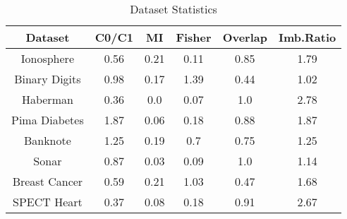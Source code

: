\begin{table}[htbp]
\caption{Dataset Statistics}
\begin{center}
\begin{tabular}{|c|c|c|c|c|c|}
\hline
\textbf{Dataset} & \textbf{C0/C1} & \textbf{MI} & \textbf{Fisher} & \textbf{Overlap} & \textbf{Imb.Ratio} \\ \hline
Ionosphere & 0.56 & 0.21 & 0.11 & 0.85 & 1.79 \\ \hline
Binary Digits & 0.98 & 0.17 & 1.39 & 0.44 & 1.02 \\ \hline
Haberman & 0.36 & 0.0 & 0.07 & 1.0 & 2.78 \\ \hline
Pima Diabetes & 1.87 & 0.06 & 0.18 & 0.88 & 1.87 \\ \hline
Banknote & 1.25 & 0.19 & 0.7 & 0.75 & 1.25 \\ \hline
Sonar & 0.87 & 0.03 & 0.09 & 1.0 & 1.14 \\ \hline
Breast Cancer & 0.59 & 0.21 & 1.03 & 0.47 & 1.68 \\ \hline
SPECT Heart & 0.37 & 0.08 & 0.18 & 0.91 & 2.67 \\ \hline
\end{tabular}
\label{tab:statistics}
\end{center}
\end{table}